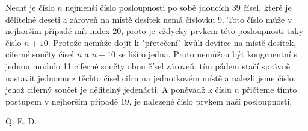 \documentclass{fkssolpub}
\author{Ondřej Sedláček}
\begin{document}
 

Nechť je číslo $n$ nejmenší číslo posloupnosti po sobě jdoucích 39 čísel, které
je dělitelné deseti a zároveň na místě desítek nemá číslovku 9. Toto číslo může
v nejhorším případě mít index 20, proto je vždycky prvkem této posloupnosti taky 
číslo $n+10$. Protože
nemůže dojít k "přetečení" kvůli devítce na místě desítek, ciferné součty čísel
$n$ a $n + 10$ se liší o jedna. Proto nemůžou být kongruentní
s jednou modulo 11 ciferné součty obou čísel zároveň, tím pádem stačí správně nastavit 
jednomu z těchto čísel cifru na jednotkovém místě
a nalezli jsme číslo, jehož ciferný součet je dělitelný jedenácti. A poněvadž
k číslu $n$ přičteme tímto postupem v nejhorším případě 19, je nalezené číslo
prvkem naší posloupnosti.

Q. E. D.
\end{document}
